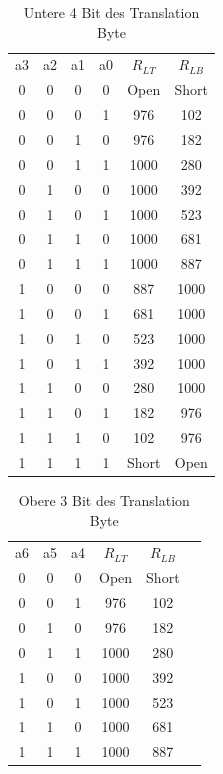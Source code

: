 \begin{table}[!ht]
\caption{Untere 4 Bit des Translation Byte}
\label{TranslationByte_Lower}
\centering
\begin{tabular}{c|c|c|c|c|c}
 a3 & a2 & a1 & a0 & $R_{LT}$ & $R_{LB}$\\
 0 & 0 & 0 & 0 & Open & Short \\ 
 0 & 0 & 0 & 1 & 976 & 102\\ 
 0 & 0 & 1 & 0 & 976 & 182\\
 0 & 0 & 1 & 1 & 1000 & 280\\ 
 0 & 1 & 0 & 0 & 1000 & 392\\ 
 0 & 1 & 0 & 1 & 1000 & 523\\ 
 0 & 1 & 1 & 0 & 1000 & 681\\ 
 0 & 1 & 1 & 1 & 1000 & 887\\
 1 & 0 & 0 & 0 & 887 & 1000 \\ 
 1 & 0 & 0 & 1 & 681 & 1000\\ 
 1 & 0 & 1 & 0 & 523 & 1000\\
 1 & 0 & 1 & 1 & 392 & 1000\\ 
 1 & 1 & 0 & 0 & 280 & 1000\\ 
 1 & 1 & 0 & 1 & 182 & 976 \\ 
 1 & 1 & 1 & 0 & 102 & 976\\ 
 1 & 1 & 1 & 1 & Short & Open\\
\end{tabular}
\end{table}

\begin{table}[!ht]
\caption{Obere 3 Bit des Translation Byte}
\label{TranslationByte_Upper}
\centering
\begin{tabular}{c|c|c|c|c|c}
 a6 & a5 & a4 & $R_{LT}$ & $R_{LB}$\\
 0 & 0 & 0 & Open & Short \\ 
 0 & 0 & 1 & 976 & 102\\ 
 0 & 1 & 0 & 976 & 182\\
 0 & 1 & 1 & 1000 & 280\\ 
 1 & 0 & 0 & 1000 & 392\\ 
 1 & 0 & 1 & 1000 & 523\\ 
 1 & 1 & 0 & 1000 & 681\\ 
 1 & 1 & 1 & 1000 & 887\\

\end{tabular}
\end{table}

